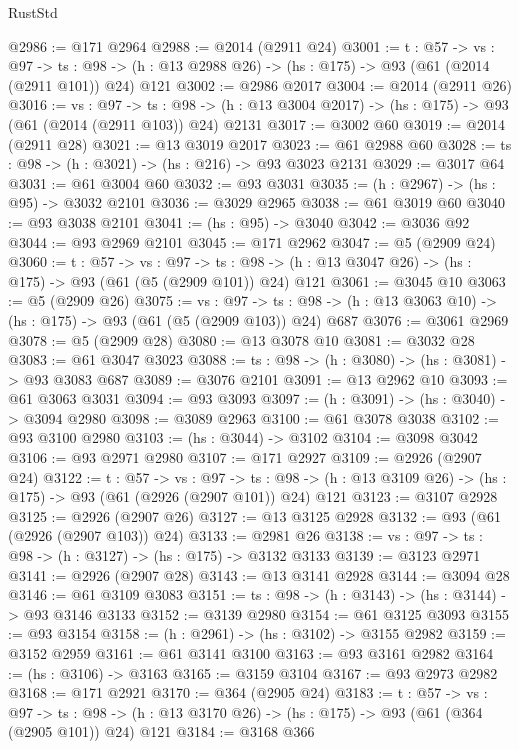 \begin{lexlean}{RustStd}
\begin{coremodule}
{\begin{coremodule}
{{{{{{{{{@2986 := @171 @2964
@2988 := @2014 (@2911 @24)
@3001 := {t : @57} ->
  {vs : @97} ->
  {ts : @98} -> (h : @13 @2988 @26) -> (hs : @175) -> @93 (@61 (@2014 (@2911 @101)) @24) @121
@3002 := @2986 @2017
@3004 := @2014 (@2911 @26)
@3016 := {vs : @97} ->
  {ts : @98} -> (h : @13 @3004 @2017) -> (hs : @175) -> @93 (@61 (@2014 (@2911 @103)) @24) @2131
@3017 := @3002 @60
@3019 := @2014 (@2911 @28)
@3021 := @13 @3019 @2017
@3023 := @61 @2988 @60
@3028 := {ts : @98} -> (h : @3021) -> (hs : @216) -> @93 @3023 @2131
@3029 := @3017 @64
@3031 := @61 @3004 @60
@3032 := @93 @3031
@3035 := (h : @2967) -> (hs : @95) -> @3032 @2101
@3036 := @3029 @2965
@3038 := @61 @3019 @60
@3040 := @93 @3038 @2101
@3041 := (hs : @95) -> @3040
@3042 := @3036 @92
@3044 := @93 @2969 @2101
@3045 := @171 @2962
@3047 := @5 (@2909 @24)
@3060 := {t : @57} ->
  {vs : @97} ->
  {ts : @98} -> (h : @13 @3047 @26) -> (hs : @175) -> @93 (@61 (@5 (@2909 @101)) @24) @121
@3061 := @3045 @10
@3063 := @5 (@2909 @26)
@3075 := {vs : @97} ->
  {ts : @98} -> (h : @13 @3063 @10) -> (hs : @175) -> @93 (@61 (@5 (@2909 @103)) @24) @687
@3076 := @3061 @2969
@3078 := @5 (@2909 @28)
@3080 := @13 @3078 @10
@3081 := @3032 @28
@3083 := @61 @3047 @3023
@3088 := {ts : @98} -> (h : @3080) -> (hs : @3081) -> @93 @3083 @687
@3089 := @3076 @2101
@3091 := @13 @2962 @10
@3093 := @61 @3063 @3031
@3094 := @93 @3093
@3097 := (h : @3091) -> (hs : @3040) -> @3094 @2980
@3098 := @3089 @2963
@3100 := @61 @3078 @3038
@3102 := @93 @3100 @2980
@3103 := (hs : @3044) -> @3102
@3104 := @3098 @3042
@3106 := @93 @2971 @2980
@3107 := @171 @2927
@3109 := @2926 (@2907 @24)
@3122 := {t : @57} ->
  {vs : @97} ->
  {ts : @98} -> (h : @13 @3109 @26) -> (hs : @175) -> @93 (@61 (@2926 (@2907 @101)) @24) @121
@3123 := @3107 @2928
@3125 := @2926 (@2907 @26)
@3127 := @13 @3125 @2928
@3132 := @93 (@61 (@2926 (@2907 @103)) @24)
@3133 := @2981 @26
@3138 := {vs : @97} -> {ts : @98} -> (h : @3127) -> (hs : @175) -> @3132 @3133
@3139 := @3123 @2971
@3141 := @2926 (@2907 @28)
@3143 := @13 @3141 @2928
@3144 := @3094 @28
@3146 := @61 @3109 @3083
@3151 := {ts : @98} -> (h : @3143) -> (hs : @3144) -> @93 @3146 @3133
@3152 := @3139 @2980
@3154 := @61 @3125 @3093
@3155 := @93 @3154
@3158 := (h : @2961) -> (hs : @3102) -> @3155 @2982
@3159 := @3152 @2959
@3161 := @61 @3141 @3100
@3163 := @93 @3161 @2982
@3164 := (hs : @3106) -> @3163
@3165 := @3159 @3104
@3167 := @93 @2973 @2982
@3168 := @171 @2921
@3170 := @364 (@2905 @24)
@3183 := {t : @57} ->
  {vs : @97} ->
  {ts : @98} -> (h : @13 @3170 @26) -> (hs : @175) -> @93 (@61 (@364 (@2905 @101)) @24) @121
@3184 := @3168 @366
}}}}}}}}}
\end{coremodule}}
\end{coremodule}
\end{lexlean}
